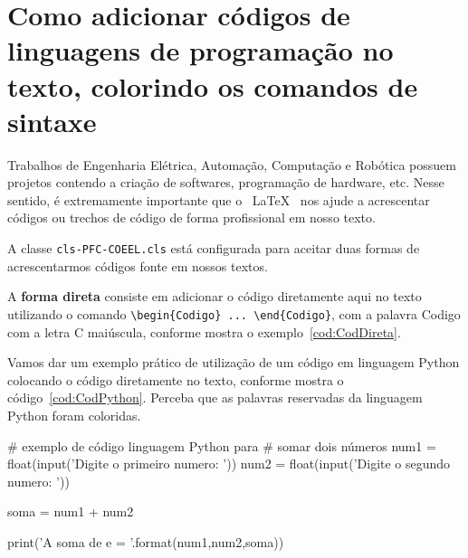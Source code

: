 
\vspace{2cm}

\section{Como adicionar códigos de linguagens de programação no texto, colorindo os comandos de sintaxe}

Trabalhos de Engenharia Elétrica, Automação, Computação e Robótica possuem projetos contendo a criação de softwares, programação de hardware, etc. Nesse sentido, é extremamente importante que o ~\LaTeX~ nos ajude a acrescentar códigos ou trechos de código de forma profissional em nosso texto. 

A classe \verb|cls-PFC-COEEL.cls| está configurada para aceitar duas formas de acrescentarmos códigos fonte em nossos textos.

A {\bf forma direta} consiste em adicionar o código diretamente aqui no texto utilizando o comando \verb|\begin{Codigo} ... \end{Codigo}|, com a palavra Codigo com a letra C maiúscula, conforme mostra o exemplo~\ref{cod:CodDireta}.

\pagebreak\newpage\clearpage

\begin{Codigo}[language=tex, caption=Forma direta de acrescentar Códigos no texto, label=cod:CodDireta]
    \begin{codigo}[language=Nome da Linguagem,
        caption=Titulo do Codigo,
        label=cod:LabelCodigo]
    \end{codigo}
\end{Codigo}

Vamos dar um exemplo prático de utilização de um código em linguagem Python colocando o código diretamente no texto, conforme mostra o código~\ref{cod:CodPython}. Perceba que as palavras reservadas da linguagem Python foram coloridas.

\begin{Codigo}[language=Python, caption=Programa em Python para Somar Dois Números, label=cod:CodPython]
    # exemplo de código linguagem  Python para
    # somar dois números
    num1 = float(input('Digite o primeiro numero: '))
    num2 = float(input('Digite o segundo numero: '))

    soma = num1 + num2

    print('A soma de {} e {} = {}'.format(num1,num2,soma))
\end{Codigo}

